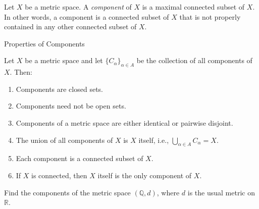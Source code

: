 \documentclass[12pt, a4paper]{article}
\begin{document}
\begin{definition}[Component]
    Let \(X\) be a metric space. A \textit{component} of \(X\) is a maximal connected subset of \(X\). In other words, a component is a connected subset of \(X\) that is not properly contained in any other connected subset of \(X\).
\end{definition}

\clearpage

\begin{heading}
    Properties of Components
\end{heading}

\vspace{10pt}

\begin{theorem}
    Let \(X\) be a metric space and let \(\{C_\alpha\}_{\alpha \in A}\) be the collection of all components of \(X\). Then:
    \begin{enumerate}
        \item Components are closed sets.
        \item Components need not be open sets.
        \item Components of a metric space are either identical or pairwise disjoint.
        \item The union of all components of \(X\) is \(X\) itself, i.e., \(\bigcup_{\alpha \in A} C_\alpha = X\).
        \item Each component is a connected subset of \(X\).
        \item If \(X\) is connected, then \(X\) itself is the only component of \(X\).
    \end{enumerate}
\end{theorem}

\clearpage

\begin{problem}
    Find the components of the metric space $(\mathbb{Q}, d)$, where $d$ is the usual metric on $\mathbb{R}$.
\end{problem}


\EndPage
\end{document}
